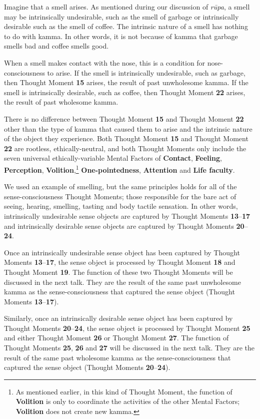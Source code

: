 Imagine that a smell arises. As mentioned during our discussion of \textit{rūpa}, a smell may be intrinsically undesirable, such as the smell of garbage or intrinsically desirable such as the smell of coffee. The intrinsic nature of a smell has nothing to do with kamma. In other words, it is not because of kamma that garbage smells bad and coffee smells good.

When a smell makes contact with the nose, this is a condition for nose-consciousness to arise. If the smell is intrinsically undesirable, such as garbage, then Thought Moment \textbf{15} arises, the result of past unwholesome kamma. If the smell is intrinsically desirable, such as coffee, then Thought Moment \textbf{22} arises, the result of past wholesome kamma.

There is no difference between Thought Moment \textbf{15} and Thought Moment \textbf{22} other than the type of kamma that caused them to arise and the intrinsic nature of the object they experience. Both Thought Moment \textbf{15} and Thought Moment \textbf{22} are rootless, ethically-neutral, and both Thought Moments only include the seven universal ethically-variable Mental Factors of \textbf{Contact}, \textbf{Feeling}, \textbf{Perception}, \textbf{Volition},\footnote{As mentioned earlier, in this kind of Thought Moment, the function of \textbf{Volition} is only to coordinate the activities of the other Mental Factors; \textbf{Volition} does not create new kamma.} \textbf{One-pointedness}, \textbf{Attention} and \textbf{Life faculty}.

We used an example of smelling, but the same principles holds for all of the sense-consciousness Thought Moments; those responsible for the bare act of seeing, hearing, smelling, tasting and body tactile sensation. In other words, intrinsically undesirable sense objects are captured by Thought Moments \textbf{13}--\textbf{17} and intrinsically desirable sense objects are captured by Thought Moments \textbf{20}--\textbf{24}.

Once an intrinsically undesirable sense object has been captured by Thought Moments \textbf{13}--\textbf{17}, the sense object is processed by Thought Moment \textbf{18} and Thought Moment \textbf{19}. The function of these two Thought Moments will be discussed in the next talk. They are the result of the same past unwholesome kamma as the sense-consciousness that captured the sense object (Thought Moments \textbf{13}--\textbf{17}).

Similarly, once an intrinsically desirable sense object has been captured by Thought Moments \textbf{20}--\textbf{24}, the sense object is processed by Thought Moment \textbf{25} and either Thought Moment \textbf{26} or Thought Moment \textbf{27}. The function of Thought Moments \textbf{25}, \textbf{26} and \textbf{27} will be discussed in the next talk. They are the result of the same past wholesome kamma as the sense-consciousness that captured the sense object (Thought Moments \textbf{20}--\textbf{24}).

